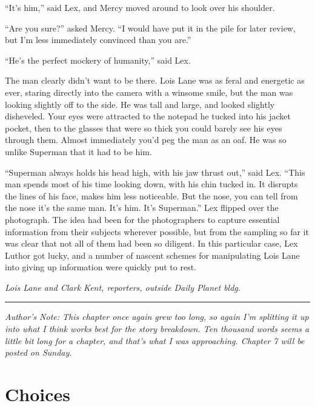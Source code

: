 \documentclass[ebook,12pt]{memoir}
\begin{document}
``It's him,'' said Lex, and Mercy moved around to look over his
shoulder.

``Are you sure?'' asked Mercy. ``I would have put it in the pile for
later review, but I'm less immediately convinced than you are.''

``He's the perfect mockery of humanity,'' said Lex.

The man clearly didn't want to be there. Lois Lane was as feral and
energetic as ever, staring directly into the camera with a winsome
smile, but the man was looking slightly off to the side. He was tall and
large, and looked slightly disheveled. Your eyes were attracted to the
notepad he tucked into his jacket pocket, then to the glasses that were
so thick you could barely see his eyes through them. Almost immediately
you'd peg the man as an oaf. He was so unlike Superman that it had to be
him.

``Superman always holds his head high, with his jaw thrust out,'' said
Lex. ``This man spends most of his time looking down, with his chin
tucked in. It disrupts the lines of his face, makes him less noticeable.
But the nose, you can tell from the nose it's the same man. It's him.
It's Superman.'' Lex flipped over the photograph. The idea had been for
the photographers to capture essential information from their subjects
wherever possible, but from the sampling so far it was clear that not
all of them had been so diligent. In this particular case, Lex Luthor
got lucky, and a number of nascent schemes for manipulating Lois Lane
into giving up information were quickly put to rest.

\emph{Lois Lane and Clark Kent, reporters, outside Daily Planet bldg.}

\begin{center}\rule{0.5\linewidth}{0.5pt}\end{center}

\emph{Author's Note: This chapter once again grew too long, so again I'm
splitting it up into what I think works best for the story breakdown.
Ten thousand words seems a little bit long for a chapter, and that's
what I was approaching. Chapter 7 will be posted on Sunday.}



\hypertarget{choices}{%
\chapter{Choices}\label{choices}}
\end{document}
